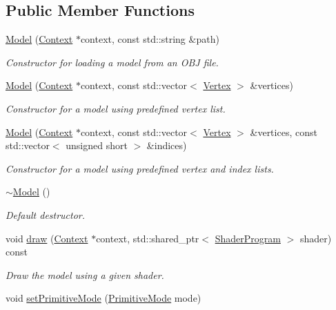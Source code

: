 \subsection*{Public Member Functions}
\begin{DoxyCompactItemize}
\item 
\hyperlink{class_model_abdd56a8ab376bfaad4ba8f19a06bebfb}{Model} (\hyperlink{class_context}{Context} $\ast$context, const std\+::string \&path)
\begin{DoxyCompactList}\small\item\em Constructor for loading a model from an O\+BJ file. \end{DoxyCompactList}\item 
\hyperlink{class_model_afcac6a00d14c867c891fbdcab4b39bc2}{Model} (\hyperlink{class_context}{Context} $\ast$context, const std\+::vector$<$ \hyperlink{struct_model_1_1_vertex}{Vertex} $>$ \&vertices)
\begin{DoxyCompactList}\small\item\em Constructor for a model using predefined vertex list. \end{DoxyCompactList}\item 
\hyperlink{class_model_aeea356baee526151b46b30f86c158a10}{Model} (\hyperlink{class_context}{Context} $\ast$context, const std\+::vector$<$ \hyperlink{struct_model_1_1_vertex}{Vertex} $>$ \&vertices, const std\+::vector$<$ unsigned short $>$ \&indices)
\begin{DoxyCompactList}\small\item\em Constructor for a model using predefined vertex and index lists. \end{DoxyCompactList}\item 
\hyperlink{class_model_ad6ebd2062a0b823db841a0b88baac4c0}{$\sim$\+Model} ()
\begin{DoxyCompactList}\small\item\em Default destructor. \end{DoxyCompactList}\item 
void \hyperlink{class_model_afb320a52ec7f8f8512eb6514cfc58848}{draw} (\hyperlink{class_context}{Context} $\ast$context, std\+::shared\+\_\+ptr$<$ \hyperlink{class_shader_program}{Shader\+Program} $>$ shader) const 
\begin{DoxyCompactList}\small\item\em Draw the model using a given shader. \end{DoxyCompactList}\item 
void \hyperlink{class_model_a07d55d70f3ec47d819e6ea75410ceb19}{set\+Primitive\+Mode} (\hyperlink{_model_8h_a8e9638a65349c0abba4e6b97c8251994}{Primitive\+Mode} mode)

\end{DoxyCompactItemize}
